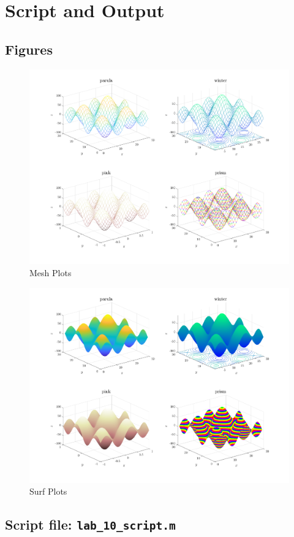 \section{Script and Output}
\subsection{Figures}

\begin{figure}[!hbtp]
    \centering
    \includegraphics[width=\textwidth]{../src/lab_10_figure_1.pdf}
    \caption{Mesh Plots}
    \label{fig:my_label}
\end{figure}

\begin{figure}[!hbtp]
    \centering
    \includegraphics[width=\textwidth]{../src/lab_10_figure_2.pdf}
    \caption{Surf Plots}
    \label{fig:my_label}
\end{figure}

\newpage
\subsection{Script file: \lstinline[style=Plain]{lab_10_script.m}}


